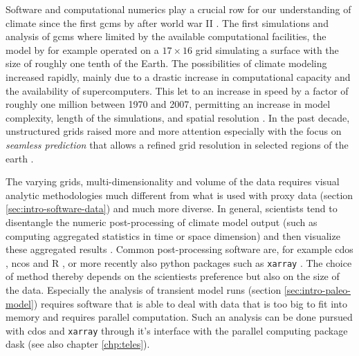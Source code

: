 \begin{refsection}
Software and computational numerics play a crucial row for our understanding of climate since the first \glspl{gcm} by \cite{Phillips1956} after world war II \citep{Edwards2010, Lewis1998}. The first simulations and analysis of \glspl{gcm} where limited by the available computational facilities, the model by \cite{Phillips1956} for example operated on a $17 \times 16$ grid simulating a surface with the size of roughly one tenth of the Earth. The possibilities of climate modeling increased rapidly, mainly due to a drastic increase in computational capacity and the availability of supercomputers. This let to an increase in speed by a factor of roughly one million between 1970 and 2007, permitting an increase in model complexity, length of the simulations, and spatial resolution \citep{TreutSomervilleCubaschEtAl2007}. In the past decade, unstructured grids raised more and more attention \citep{ZaenglReinertRipodasEtAl2014, SkamarockKlempDudaEtAl2012} especially with the focus on \textit{seamless prediction} \citep{Hoskins2012, BauerThorpeBrunet2015} that allows a refined grid resolution in selected regions of the earth \citep{RautenhausBoettingerSiemenEtAl2018}.

The varying grids, multi-dimensionality and volume of the data requires visual analytic methodologies much different from what is used with proxy data (section \ref{sec:intro-software-data}) and much more diverse. In general, scientists tend to disentangle the numeric post-processing of climate model output (such as computing aggregated statistics in time or space dimension) and then visualize these aggregated results \citep{BoettingerRoeber2019, SchulzNockeHeitzlerEtAl2013}. Common post-processing software are, for example \glspl{cdo} \citep{Schulzweida2019}, \glspl{nco} \citep{Zender2008, ZenderMangalam2007, Zender2016} and R \citep{RCT2019}, or more recently also python packages such as \texttt{xarray} \citep{HoyerHamman2017}. The choice of method thereby depends on the scientiests preference but also on the size of the data. Especially the analysis of transient model runs (section \ref{sec:intro-paleo-model}) requires software that is able to deal with data that is too big to fit into memory and requires parallel computation. Such an analysis can be done pursued with \glspl{cdo} and \texttt{xarray} through it's interface with the parallel computing package dask \citep{DDT2016, Rocklin2015} (see also chapter \ref{chp:teles}).


\end{refsection}
